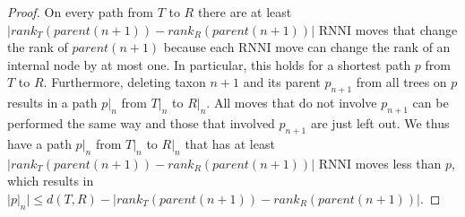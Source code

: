 \documentclass[11pt, a4paper]{article}
\newcommand{\nni}{\mathrm{NNI}}
\newcommand{\rnni}{\mathrm{RNNI}}
\begin{document}
\begin{proof}
    On every path from $T$ to $R$ there are at least $|rank_T(parent(n+1)) - rank_R(parent(n+1))|$ $\rnni$ moves that change the rank of $parent(n+1)$ because each $\rnni$ move can change the rank of an internal node by at most one.
    In particular, this holds for a shortest path $p$ from $T$ to $R$.
    Furthermore, deleting taxon $n+1$ and its parent $p_{n+1}$ from all trees on $p$ results in a path $p|_n$ from $T|_n$ to $R|_n$.
    All moves that do not involve $p_{n+1}$ can be performed the same way and those that involved $p_{n+1}$ are just left out.
    We thus have a path $p|_n$ from $T|_n$ to $R|_n$ that has at least $|rank_T(parent(n+1)) - rank_R(parent(n+1))|$ $\rnni$ moves less than $p$, which results in $|p|_n| \leq d(T,R) - |rank_T(parent(n+1)) - rank_R(parent(n+1))|$.
\end{proof}
\end{document}
